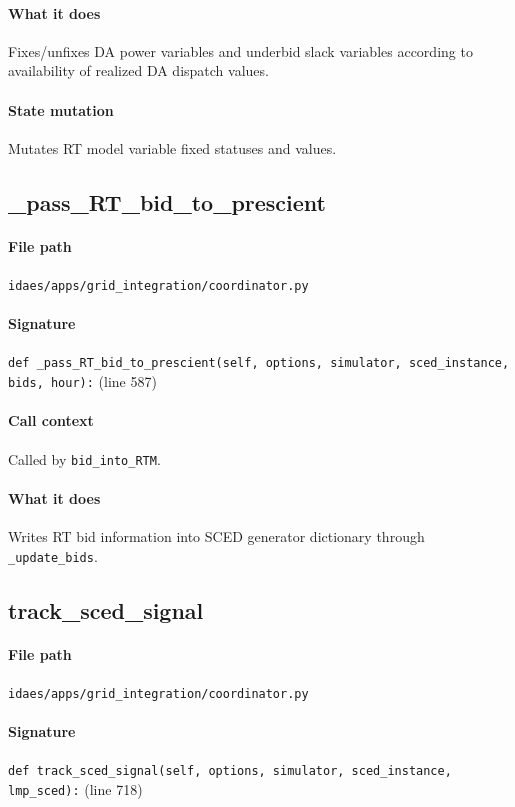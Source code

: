 \documentclass{article}
\begin{document}
\paragraph{What it does} Fixes/unfixes DA power variables and underbid slack variables according to availability of realized DA dispatch values.
\paragraph{State mutation} Mutates RT model variable fixed statuses and values.

\subsection{\_pass\_RT\_bid\_to\_prescient}\label{fn:pass_RT_bid_to_prescient}
\paragraph{File path} \texttt{idaes/apps/grid\_integration/coordinator.py}
\paragraph{Signature} \texttt{def \_pass\_RT\_bid\_to\_prescient(self, options, simulator, sced\_instance, bids, hour):} (line 587)
\paragraph{Call context} Called by \texttt{bid\_into\_RTM}.
\paragraph{What it does} Writes RT bid information into SCED generator dictionary through \texttt{\_update\_bids}.

\subsection{track\_sced\_signal}\label{fn:track_sced_signal}
\paragraph{File path} \texttt{idaes/apps/grid\_integration/coordinator.py}
\paragraph{Signature} \texttt{def track\_sced\_signal(self, options, simulator, sced\_instance, lmp\_sced):} (line 718)
\end{document}
